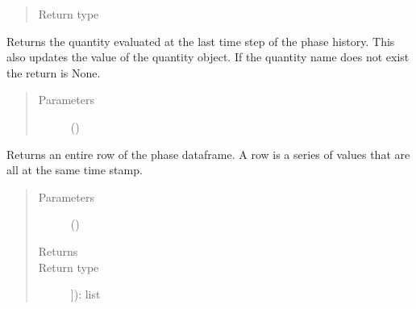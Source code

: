 \documentclass[letterpaper,10pt,openany,oneside,english]{sphinxmanual}
\begin{document}
\begin{fulllineitems}
\begin{fulllineitems}
\begin{quote}
\begin{description}
\item[{Return type}] \leavevmode
{}

\end{description}\end{quote}

\end{fulllineitems}


\begin{fulllineitems}
\label{\detokenize{support_rst/phase:phase.Phase.GetQuantity}}
Returns the quantity evaluated at the last time step of the phase
history. This also updates the value of the quantity object. If the
quantity name does not exist the return is None.
\begin{quote}\begin{description}
\item[{Parameters}] \leavevmode
{} () \textendash{} 

\end{description}\end{quote}

\end{fulllineitems}


\begin{fulllineitems}
\label{\detokenize{support_rst/phase:phase.Phase.GetRow}}
Returns an entire row of the phase dataframe. A row is a series of
values that are all at the same time stamp.
\begin{quote}\begin{description}
\item[{Parameters}] \leavevmode
{} () \textendash{} 

\item[{Returns}] \leavevmode
\sphinxstylestrong{list(self.\_\_phase.loc{[}time\_stamp,}

\item[{Return type}] \leavevmode
{]}): list


\end{description}
\end{quote}
\end{fulllineitems}
\end{fulllineitems}
\end{document}

